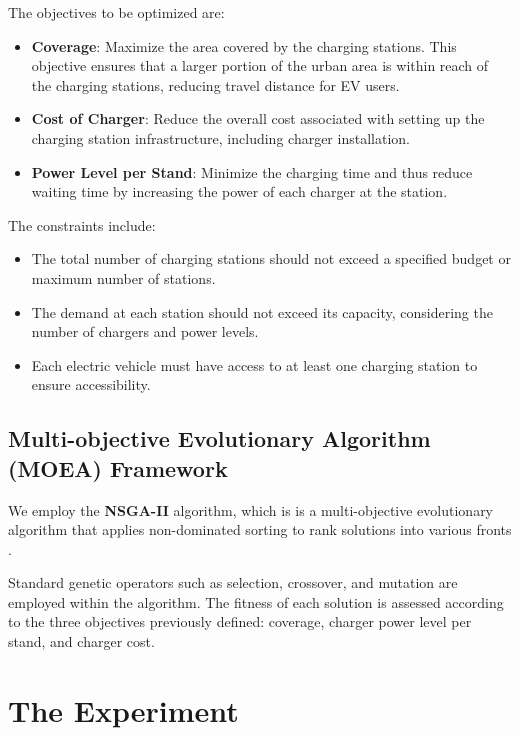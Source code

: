 \documentclass[12pt]{report}
\begin{document}
The objectives to be optimized are:
\begin{itemize}
     \item \textbf{Coverage}: Maximize the area covered by the charging stations. This objective ensures that a larger portion of the urban area is within reach of the charging stations, reducing travel distance for EV users.
    \item \textbf{Cost of Charger}: Reduce the overall cost associated with setting up the charging station infrastructure, including charger installation.   
    \item \textbf{Power Level per Stand}: Minimize the charging time and thus reduce waiting time by increasing the power of each charger at the station.
\end{itemize}

The constraints include:
\begin{itemize}
    \item The total number of charging stations should not exceed a specified budget or maximum number of stations.
    \item The demand at each station should not exceed its capacity, considering the number of chargers and power levels.
    \item Each electric vehicle must have access to at least one charging station to ensure accessibility.
\end{itemize}

\section{Multi-objective Evolutionary Algorithm (MOEA) Framework}
We employ the \textbf{NSGA-II} algorithm, which is  is a multi-objective evolutionary algorithm that applies non-dominated sorting to rank solutions into various fronts \cite{ref8}.

Standard genetic operators such as selection, crossover, and mutation are employed within the algorithm. The fitness of each solution is assessed according to the three objectives previously defined: coverage, charger power level per stand, and charger cost.

\chapter{The Experiment}
\end{document}
